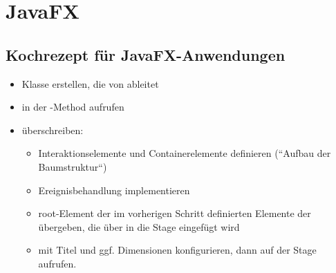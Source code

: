 \section{JavaFX}


\subsection{Kochrezept für JavaFX-Anwendungen}

\begin{itemize}
    \item Klasse erstellen, die von  ableitet
    \item in der -Method  aufrufen
    \item {} überschreiben:
    \begin{itemize}
        \item Interaktionselemente und Containerelemente definieren (``Aufbau der Baumstruktur``)
        \item Ereignisbehandlung implementieren
        \item root-Element der im vorherigen Schritt definierten Elemente der  übergeben, die über  in die Stage eingefügt wird
        \item {} mit Titel und ggf. Dimensionen konfigurieren, dann  auf der Stage aufrufen.
    \end{itemize}
\end{itemize}